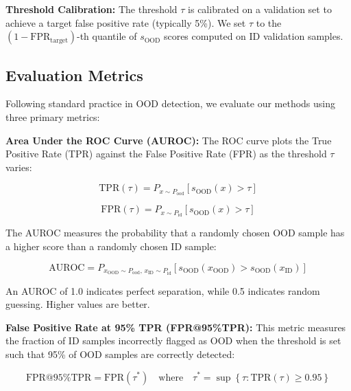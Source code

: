 \textbf{Threshold Calibration:} The threshold $\tau$ is calibrated on a validation set to achieve a target false positive rate (typically 5\%). We set $\tau$ to the $(1 - \text{FPR}_{\text{target}})$-th quantile of $s_{\text{OOD}}$ scores computed on ID validation samples.


\subsection{Evaluation Metrics}
\label{sec:meth:problem:metrics}

Following standard practice in OOD detection, we evaluate our methods using three primary metrics:

\textbf{Area Under the ROC Curve (AUROC):} The ROC curve plots the True Positive Rate (TPR) against the False Positive Rate (FPR) as the threshold $\tau$ varies:

\begin{equation}
\label{eq:meth:tpr}
\text{TPR}(\tau) = P_{x \sim P_{\text{ood}}}\!\left[s_{\text{OOD}}(x) > \tau\right]
\end{equation}

\begin{equation}
\label{eq:meth:fpr}
\text{FPR}(\tau) = P_{x \sim P_{\text{id}}}\!\left[s_{\text{OOD}}(x) > \tau\right]
\end{equation}

The AUROC measures the probability that a randomly chosen OOD sample has a higher score than a randomly chosen ID sample:

\begin{equation}
\label{eq:meth:auroc}
\text{AUROC} = P_{x_{\text{OOD}} \sim P_{\text{ood}},\, x_{\text{ID}} \sim P_{\text{id}}}\!\left[s_{\text{OOD}}(x_{\text{OOD}}) > s_{\text{OOD}}(x_{\text{ID}})\right]
\end{equation}

An AUROC of 1.0 indicates perfect separation, while 0.5 indicates random guessing. Higher values are better.

\textbf{False Positive Rate at 95\% TPR (FPR@95\%TPR):} This metric measures the fraction of ID samples incorrectly flagged as OOD when the threshold is set such that 95\% of OOD samples are correctly detected:

\begin{equation}
\label{eq:meth:fprtpr95}
\text{FPR@95\%TPR} = \text{FPR}(\tau^*) \quad\text{where}\quad \tau^* = \sup\!\left\{\tau : \text{TPR}(\tau) \geq 0.95\right\}
\end{equation}

